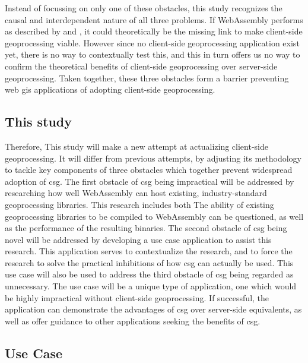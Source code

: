 Instead of focussing on only one of these obstacles, this study recognizes the causal and interdependent nature of all three problems. If WebAssembly performs as described by \cite{haas_bringing_2017} and \cite{jangda_not_2019}, it could theoretically be the missing link to make client-side geoprocessing viable. However since no client-side geoprocessing application exist yet, there is no way to contextually test this, and this in turn offers us no way to confirm the theoretical benefits of client-side geoprocessing over server-side geoprocessing. Taken together, these three obstacles form a barrier preventing web \ac{gis} applications of adopting client-side geoprocessing. 

\subsection{This study}

Therefore, This study will make a new attempt at actualizing client-side geoprocessing. 
It will differ from previous attempts, by adjusting its methodology to tackle key components of three obstacles which together prevent widespread adoption of \ac{csg}.
The first obstacle of \ac{csg} being impractical will be addressed by researching how well WebAssembly can host existing, industry-standard geoprocessing libraries. 
This research includes both The ability of existing geoprocessing libraries to be compiled to WebAssembly can be questioned, as well as the performance of the resulting binaries.  
The second obstacle of \ac{csg} being novel will be addressed by developing a use case application to assist this research. This application serves to contextualize the research, and to force the research to solve the practical inhibitions of how \ac{csg} can actually be used. 
This use case will also be used to address the third obstacle of \ac{csg} being regarded as unnecessary. The use case will be a unique type of application, one which would be highly impractical without client-side geoprocessing. 
If successful, the application can demonstrate the advantages of \ac{csg} over server-side equivalents, as well as offer guidance to other applications seeking the benefits of \ac{csg}.

\subsection{Use Case}

